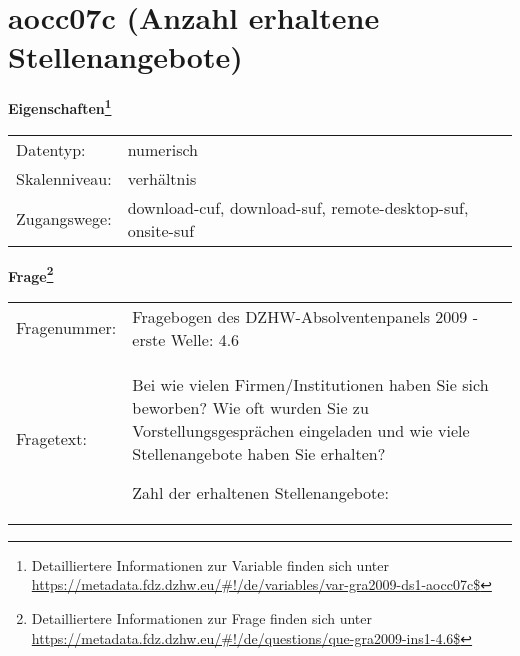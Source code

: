 
    \setcounter{footnote}{0}

    \vspace*{-1.8cm}
	\section{aocc07c (Anzahl erhaltene Stellenangebote)}
	\label{section:aocc07c}



    \vspace*{0.5cm}
    \noindent\textbf{Eigenschaften\footnote{Detailliertere Informationen zur Variable finden sich unter
		\url{https://metadata.fdz.dzhw.eu/\#!/de/variables/var-gra2009-ds1-aocc07c$}}}\\
	\begin{tabularx}{\hsize}{@{}lX}
	Datentyp: & numerisch \\
	Skalenniveau: & verhältnis \\
	Zugangswege: &
	  download-cuf, 
	  download-suf, 
	  remote-desktop-suf, 
	  onsite-suf
 \\
    \end{tabularx}



				\vspace*{0.5cm}
                \noindent\textbf{Frage\footnote{Detailliertere Informationen zur Frage finden sich unter
		              \url{https://metadata.fdz.dzhw.eu/\#!/de/questions/que-gra2009-ins1-4.6$}}}\\
				\begin{tabularx}{\hsize}{@{}lX}
					Fragenummer: &
					  Fragebogen des DZHW-Absolventenpanels 2009 - erste Welle:
					  4.6
 \\
					Fragetext: & Bei wie vielen Firmen/Institutionen haben Sie sich beworben? Wie oft wurden Sie zu Vorstellungsgesprächen eingeladen und wie viele Stellenangebote haben Sie erhalten?\par  Zahl der erhaltenen Stellenangebote: \\
				\end{tabularx}






